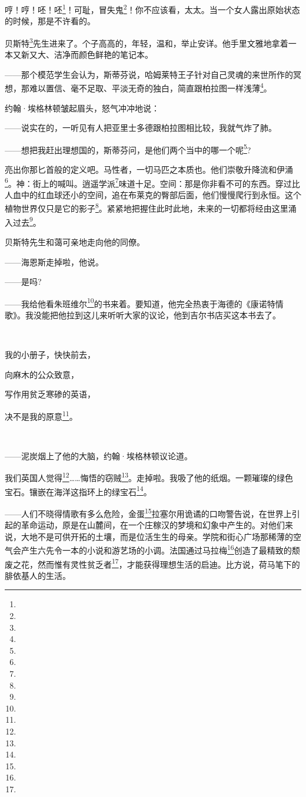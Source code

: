 \par 哼！哼！呸！呸\footnote{}！可耻，冒失鬼\footnote{}！你不应该看，太太。当一个女人露出原始状态的时候，那是不许看的。
\par 贝斯特\footnote{}先生进来了。个子高高的，年轻，温和，举止安详。他手里文雅地拿着一本又新又大、洁净而颜色鲜艳的笔记本。
\par ——那个模范学生会认为，斯蒂芬说，哈姆莱特王子针对自己灵魂的来世所作的冥想，那难以置信、毫不足取、平淡无奇的独白，简直跟柏拉图一样浅薄\footnote{}。
\par 约翰·埃格林顿皱起眉头，怒气冲冲地说：
\par ——说实在的，一听见有人把亚里士多德跟柏拉图相比较，我就气炸了肺。
\par ——想把我赶出理想国的，斯蒂芬问，是他们两个当中的哪一个呢\footnote{}?
\par 亮出你那匕首般的定义吧。马性者，一切马匹之本质也。他们崇敬升降流和伊涌\footnote{}。神：街上的喊叫。逍遥学派\footnote{}味道十足。空间：那是你非看不可的东西。穿过比人血中的红血球还小的空间，追在布莱克的臀部后面，他们慢慢爬行到永恒。这个植物世界仅只是它的影子\footnote{}。紧紧地把握住此时此地，未来的一切都将经由这里涌入过去\footnote{}。
\par 贝斯特先生和蔼可亲地走向他的同僚。
\par ——海恩斯走掉啦，他说。
\par ——是吗?
\par ——我给他看朱班维尔\footnote{}的书来着。要知道，他完全热衷于海德的《康诺特情歌》。我没能把他拉到这儿来听听大家的议论，他到吉尔书店买这本书去了。
\par  
\par 我的小册子，快快前去，
\par 向麻木的公众致意，
\par 写作用贫乏寒碜的英语，
\par 决不是我的原意\footnote{}。
\par  
\par ——泥炭烟上了他的大脑，约翰·埃格林顿议论道。
\par 我们英国人觉得\footnote{}……悔悟的窃贼\footnote{}。走掉啦。我吸了他的纸烟。一颗璀璨的绿色宝石。镶嵌在海洋这指环上的绿宝石\footnote{}。
\par ——人们不晓得情歌有多么危险，金蛋\footnote{}拉塞尔用诡谲的口吻警告说，在世界上引起的革命运动，原是在山麓间，在一个庄稼汉的梦境和幻象中产生的。对他们来说，大地不是可供开拓的土壤，而是位活生生的母亲。学院和街心广场那稀薄的空气会产生六先令一本的小说和游艺场的小调。法国通过马拉梅\footnote{}创造了最精致的颓废之花，然而惟有灵性贫乏者\footnote{}，才能获得理想生活的启迪。比方说，荷马笔下的腓依基人的生活。
